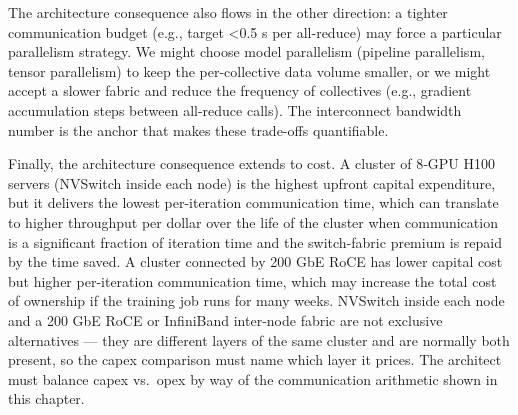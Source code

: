 The architecture consequence also flows in the other direction: a
tighter communication budget (e.g., target \textless0.5 s per
all-reduce) may force a particular parallelism strategy. We might choose
model parallelism (pipeline parallelism, tensor parallelism) to keep the
per-collective data volume smaller, or we might accept a slower fabric
and reduce the frequency of collectives (e.g., gradient accumulation
steps between all-reduce calls). The interconnect bandwidth number is
the anchor that makes these trade-offs quantifiable.

Finally, the architecture consequence extends to cost. A cluster of
8‑GPU H100 servers (NVSwitch inside each node) is the highest upfront
capital expenditure, but it delivers the lowest per-iteration
communication time, which can translate to higher throughput per dollar
over the life of the cluster when communication is a significant
fraction of iteration time and the switch-fabric premium is repaid by
the time saved. A cluster connected by 200 GbE RoCE has lower capital
cost but higher per-iteration communication time, which may increase the
total cost of ownership if the training job runs for many weeks.
NVSwitch inside each node and a 200 GbE RoCE or InfiniBand inter-node
fabric are not exclusive alternatives --- they are different layers of
the same cluster and are normally both present, so the capex comparison
must name which layer it prices. The architect must balance capex
vs.~opex by way of the communication arithmetic shown in this chapter.

\label{what-we-still-dont-know}


